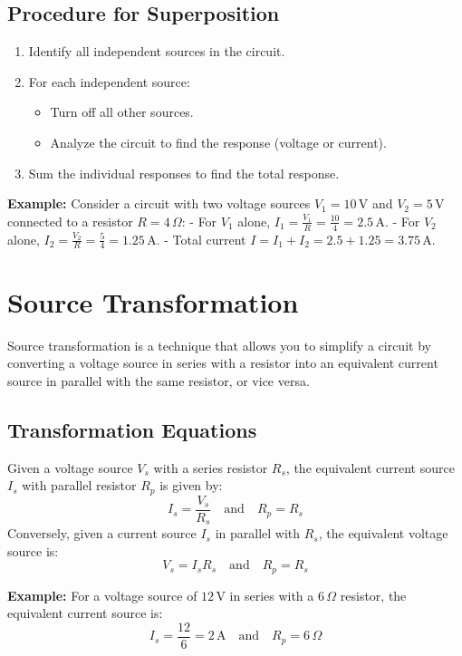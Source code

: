 \documentclass[openany]{book}
\begin{document}
\subsection{Procedure for Superposition}
\begin{enumerate}
\item{Identify all independent sources in the circuit.}

\item{For each independent source:}
	\begin{itemize}
         \item{Turn off all other sources.}
   
         \item{Analyze the circuit to find the response (voltage or current).}
	\end{itemize}
\item{Sum the individual responses to find the total response.}
\end{enumerate}

\textbf{Example:} Consider a circuit with two voltage sources \(V_1 = 10 \, \text{V}\) and \(V_2 = 5 \, \text{V}\) connected to a resistor \(R = 4 \, \Omega\):
- For \(V_1\) alone, \(I_1 = \frac{V_1}{R} = \frac{10}{4} = 2.5 \, \text{A}\).
- For \(V_2\) alone, \(I_2 = \frac{V_2}{R} = \frac{5}{4} = 1.25 \, \text{A}\).
- Total current \(I = I_1 + I_2 = 2.5 + 1.25 = 3.75 \, \text{A}\).

\section{Source Transformation}
Source transformation is a technique that allows you to simplify a circuit by converting a voltage source in series with a resistor into an equivalent current source in parallel with the same resistor, or vice versa.

\subsection{Transformation Equations}
Given a voltage source \(V_s\) with a series resistor \(R_s\), the equivalent current source \(I_s\) with parallel resistor \(R_p\) is given by:
\[
I_s = \frac{V_s}{R_s} \quad \text{and} \quad R_p = R_s
\]
Conversely, given a current source \(I_s\) in parallel with \(R_s\), the equivalent voltage source is:
\[
V_s = I_s R_s \quad \text{and} \quad R_p = R_s
\]

\textbf{Example:} For a voltage source of \(12 \, \text{V}\) in series with a \(6 \, \Omega\) resistor, the equivalent current source is:
\[
I_s = \frac{12}{6} = 2 \, \text{A} \quad \text{and} \quad R_p = 6 \, \Omega
\]
\end{document}

